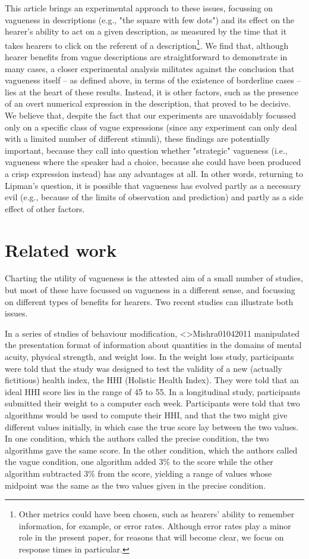 \documentclass[%
man,		%
floatsintext,%
apacite%
]{apa6} %
\begin{document}
This article brings an experimental approach to these issues, focussing on vagueness in descriptions (e.g., "the square with few dots") and its effect on the hearer's ability to act on a given description, as measured by the time that it takes hearers to click on the referent of a description\footnote{Other metrics could have been chosen, such as hearers' ability to remember information, for example, or error rates. Although error rates play a minor role in the present paper, for reasons that will become clear, we focus on response times in particular.}. We find that, although hearer benefits from vague descriptions are straightforward to demonstrate in many cases, a closer experimental analysis militates against the conclusion that vagueness itself -- as defined above, in terms of the existence of borderline cases -- lies at the heart of these results. Instead, it is other factors, such as the presence of an overt numerical expression in the description, that proved to be decisive. We believe that, despite the fact that our experiments are unavoidably focussed only on a specific class of vague expressions (since any experiment can only deal with a limited number of different stimuli), these findings are potentially important, because they call into question whether "strategic" vagueness (i.e., vagueness where the speaker had a choice, because she could have been produced a crisp expression instead) has any advantages at all. In other words, returning to Lipman's question, it is possible that vagueness has evolved partly as a necessary evil (e.g., because of the limits of observation and prediction) and partly as a side effect of other factors.

\section{Related work}

Charting the utility of vagueness is the attested aim of a small number of studies, but most of these have focussed on vagueness in a different sense, and focussing on different types of benefits for hearers. Two recent studies can illustrate both issues. 

In a series of studies of behaviour modification, \citeA<>{Mishra01042011} manipulated the presentation format of information about quantities in the domains of mental acuity, physical strength, and weight loss. In the weight loss study, participants were told that the study was designed to test the validity of a new (actually fictitious) health index, the HHI (Holistic Health Index). They were told that an ideal HHI score lies in the range of 45 to 55. In a longitudinal study, participants submitted their weight to a computer each week. Participants were told that two algorithms would be used to compute their HHI, and that the two might give different values initially, in which case the true score lay between the two values. In one condition, which the authors called the precise condition, the two algorithms gave the same score. In the other condition, which the authors called the vague condition, one algorithm added 3\% to the score while the other algorithm subtracted 3\% from the score, yielding a range of values whose midpoint was the same as the two values given in the precise condition. 
\end{document}
